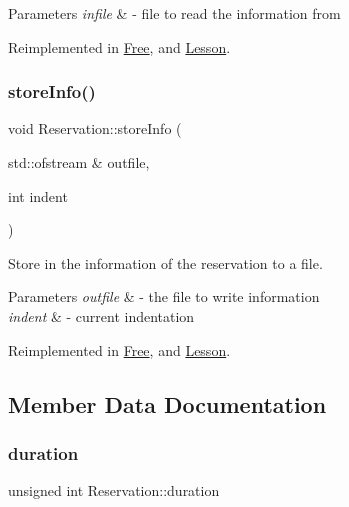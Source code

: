 \begin{DoxyParams}{Parameters}
{\em infile} & -\/ file to read the information from \\
\hline
\end{DoxyParams}


Reimplemented in \mbox{\hyperlink{class_free_ad1023c825c9790edf0797e2e69dd2fcf}{Free}}, and \mbox{\hyperlink{class_lesson_a3ac64e2f79bc9e381634d5d30499e8f1}{Lesson}}.

\mbox{\label{class_reservation_a8ec83fe2eb15294c3a51a9998ed17df7}} 
\subsubsection{\texorpdfstring{store\+Info()}{storeInfo()}}
{\footnotesize\ttfamily void Reservation\+::store\+Info (\begin{DoxyParamCaption}\item[{std\+::ofstream \&}]{outfile,  }\item[{int}]{indent }\end{DoxyParamCaption})\hspace{0.3cm}{\ttfamily [virtual]}}



Store in the information of the reservation to a file. 


\begin{DoxyParams}{Parameters}
{\em outfile} & -\/ the file to write information \\
\hline
{\em indent} & -\/ current indentation \\
\hline
\end{DoxyParams}


Reimplemented in \mbox{\hyperlink{class_free_a5eec9da16ebf4f388d16dd270bd93b64}{Free}}, and \mbox{\hyperlink{class_lesson_a645855060ab3c915a6e0875bc5584887}{Lesson}}.



\subsection{Member Data Documentation}
\mbox{\label{class_reservation_a1a311bb23edebfa226f9c744aefdc7b1}} 
\subsubsection{\texorpdfstring{duration}{duration}}
{\footnotesize\ttfamily unsigned int Reservation\+::duration\hspace{0.3cm}{\ttfamily [protected]}}

